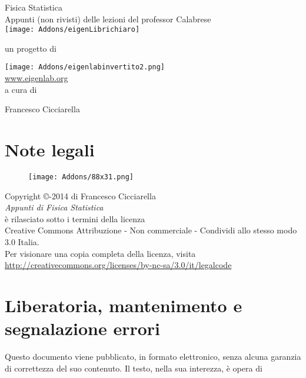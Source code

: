 \documentclass[10pt,a4paper]{report}
\theoremstyle{definition}
\numberwithin{equation}{section}
\begin{document}
\begin{titlepage}
\centering
{\Huge Fisica Statistica}\\
\vspace*{0.5cm}
{\small Appunti (non rivisti) delle lezioni del professor Calabrese}
 \\
\texttt{[image: Addons/eigenLibrichiaro]}
\begin{center}
un progetto di
\end{center}
\texttt{[image: Addons/eigenlabinvertito2.png]} \\
\url{www.eigenlab.org}
 \\
{\small a cura di}\\
\vspace*{0.5cm}
{\normalsize Francesco Cicciarella\par}
\end{titlepage}
\pagebreak

\section*{Note legali}
\begin{center}
\begin{figure}[htbp]
\centering
\texttt{[image: Addons/88x31.png]}
\end{figure}
\vspace{0.5cm}
Copyright \copyright {}-2014 di Francesco Cicciarella \\
\textit{Appunti di Fisica Statistica} \\	
è rilasciato sotto i termini della licenza \\
Creative Commons Attribuzione - Non commerciale - Condividi allo stesso modo 3.0 Italia. \\
Per visionare una copia completa della licenza, visita \\
\url{http://creativecommons.org/licenses/by-nc-sa/3.0/it/legalcode}
\end{center}
\section*{Liberatoria, mantenimento e segnalazione errori}
Questo documento viene pubblicato, in formato elettronico, senza alcuna garanzia di correttezza del suo contenuto. Il testo, nella sua interezza, è opera di \\
\end{document}
